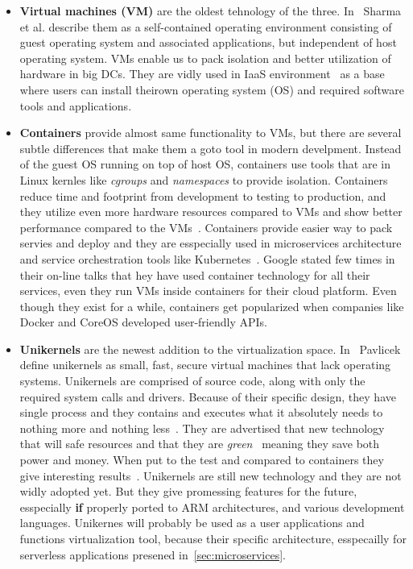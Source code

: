 \begin{itemize}
	\item \textbf{Virtual machines (VM)} are the oldest tehnology of the three. In~\cite{Sharma} Sharma et al. describe them as a self-contained operating environment consisting of guest operating system and associated applications, but independent of host operating system. VMs enable us to pack isolation and better utilization of hardware in big DCs. They are vidly used in IaaS environment~\cite{AbsalomBJ13, YangHCLW13} as a base where users can install theirown operating system (OS) and required software tools and applications.
	\item \textbf{Containers} provide almost same functionality to VMs, but there are several subtle differences that make them a goto tool in modern develpment. Instead of the guest OS running on top of host OS, containers use tools that are in Linux kernles like \textit{cgroups} and \textit{namespaces} to provide isolation. Containers reduce time and footprint from development to testing to production, and they utilize even more hardware resources compared to VMs and show better performance compared to the VMs~\cite{Seo2014PerformanceCA, FelterFRR15}. Containers provide easier way to pack servies and deploy and they are esspecially used in microservices architecture and service orchestration tools like Kubernetes~\cite{BurnsGOBW16}. Google stated few times in their on-line talks that hey have used container technology for all their services, even they run VMs inside containers for their cloud platform. Even though they exist for a while, containers get popularized when companies like Docker and CoreOS developed user-friendly APIs.
	\item \textbf{Unikernels} are the newest addition to the virtualization space. In~\cite{pavlicek2016unikernels} Pavlicek define unikernels as small, fast, secure virtual machines that lack operating systems. Unikernels are comprised of source code, along with only the required system calls and drivers. Because of their specific design, they have single process and they contains and executes what it absolutely needs to nothing more and nothing less~\cite{GoethalsSAVT18}. They are advertised that new technology that will safe resources and that they are \textit{green}~\cite{208735} meaning they save both power and money. When put to the test and compared to containers they give interesting results~\cite{GoethalsSAVT18, PlauthFP17}. Unikernels are still new technology and they are not widly adopted yet. But they give promessing features for the future, esspecially \textbf{if} properly ported to ARM architectures, and various development languages. Unikernes will probably be used as a user applications and functions virtualization tool, because their specific architecture, esspecailly for serverless applications presened in~\ref{sec:microservices}.
\end{itemize}

